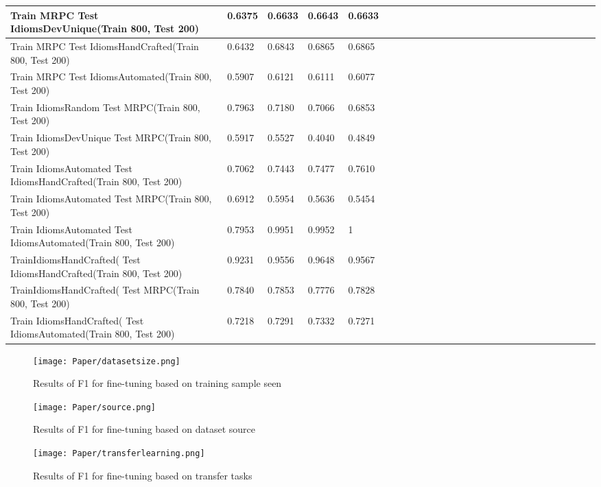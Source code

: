 \documentclass[11pt,a4paper]{article}
\begin{document}
\begin{table*}[h]
{\begin{tabular}{ | l | l | l | l | l | l | l | l | l | l | l | l | l | l | l | l | l | l | l | }
	Train MRPC Test IdiomsDevUnique(Train 800, Test 200) & 0.6375 & 0.6633 & 0.6643 & 0.6633 & \  & \  & \  & \  & \  & \  & \  & \  & \  & \  & \  & \  & \  & \  \\ \hline
	Train MRPC Test IdiomsHandCrafted(Train 800, Test 200) & 0.6432 & 0.6843 & 0.6865 & 0.6865 & \  & \  & \  & \  & \  & \  & \  & \  & \  & \  & \  & \  & \  & \  \\ \hline
	Train MRPC Test IdiomsAutomated(Train 800, Test 200) & 0.5907 & 0.6121 & 0.6111 & 0.6077 & \  & \  & \  & \  & \  & \  & \  & \  & \  & \  & \  & \  & \  & \  \\ \hline
	Train IdiomsRandom Test MRPC(Train 800, Test 200) & 0.7963 & 0.7180 & 0.7066 & 0.6853 & \  & \  & \  & \  & \  & \  & \  & \  & \  & \  & \  & \  & \  & \  \\ \hline
	Train IdiomsDevUnique Test MRPC(Train 800, Test 200) & 0.5917 & 0.5527 & 0.4040 & 0.4849 & \  & \  & \  & \  & \  & \  & \  & \  & \  & \  & \  & \  & \  & \  \\ \hline
	Train IdiomsAutomated Test IdiomsHandCrafted(Train 800, Test 200) & 0.7062 & 0.7443 & 0.7477 & 0.7610 & \  & \  & \  & \  & \  & \  & \  & \  & \  & \  & \  & \  & \  & \  \\ \hline
	Train IdiomsAutomated Test MRPC(Train 800, Test 200) & 0.6912 & 0.5954 & 0.5636 & 0.5454 & \  & \  & \  & \  & \  & \  & \  & \  & \  & \  & \  & \  & \  & \  \\ \hline
	Train IdiomsAutomated Test IdiomsAutomated(Train 800, Test 200) & 0.7953 & 0.9951 & 0.9952 & 1 & \  & \  & \  & \  & \  & \  & \  & \  & \  & \  & \  & \  & \  & \  \\ \hline
	TrainIdiomsHandCrafted( Test IdiomsHandCrafted(Train 800, Test 200) & 0.9231 & 0.9556 & 0.9648 & 0.9567 & \  & \  & \  & \  & \  & \  & \  & \  & \  & \  & \  & \  & \  & \  \\ \hline
	TrainIdiomsHandCrafted( Test MRPC(Train 800, Test 200) & 0.7840 & 0.7853 & 0.7776 & 0.7828 & \  & \  & \  & \  & \  & \  & \  & \  & \  & \  & \  & \  & \  & \  \\ \hline
	Train IdiomsHandCrafted( Test IdiomsAutomated(Train 800, Test 200) & 0.7218 & 0.7291 & 0.7332 & 0.7271 & \  & \  & \  & \  & \  & \  & \  & \  & \  & \  & \  & \  & \  & \  \\ \hline
\end{tabular}}
\end{table*}



\begin{figure*}[h]
\caption{Results of F1 for fine-tuning based on training sample seen}
\label{fig:F1FineTunedataset}
\texttt{[image: Paper/datasetsize.png]}
\end{figure*}
\begin{figure*}[h]
\caption{Results of F1 for fine-tuning based on dataset source}
\label{fig:F1FineTuneSource}
\texttt{[image: Paper/source.png]}
\end{figure*}

\begin{figure*}[h]
\caption{Results of F1 for fine-tuning based on transfer tasks}
\label{fig:F1FineTunetransfer}
\texttt{[image: Paper/transferlearning.png]}
\end{figure*}
\end{document}
